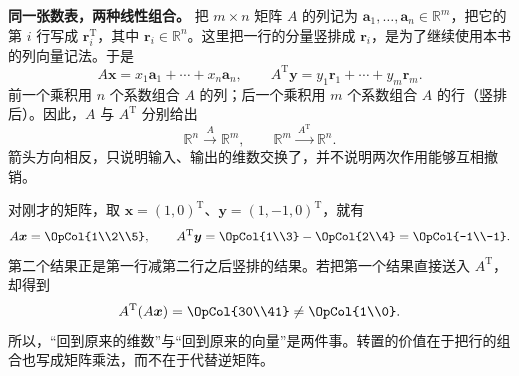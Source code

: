 \documentclass[a4paper,12pt,twoside,openany,fontset=none]{ctexbook}
\numberwithin{equation}{chapter}
\begin{document}

\par\medskip\noindent\textbf{同一张数表，两种线性组合。}
把 $m\times n$ 矩阵 $A$ 的列记为 $\boldsymbol a_1,\ldots,\boldsymbol a_n\in\mathbb R^m$，把它的第 $i$ 行写成 $\boldsymbol r_i^{\mathrm T}$，其中 $\boldsymbol r_i\in\mathbb R^n$。这里把一行的分量竖排成 $\boldsymbol r_i$，是为了继续使用本书的列向量记法。于是
\[
 A\boldsymbol x=x_1\boldsymbol a_1+\cdots+x_n\boldsymbol a_n,
 \qquad
 A^{\mathrm T}\boldsymbol y=y_1\boldsymbol r_1+\cdots+y_m\boldsymbol r_m.
\]
前一个乘积用 $n$ 个系数组合 $A$ 的列；后一个乘积用 $m$ 个系数组合 $A$ 的行（竖排后）。因此，$A$ 与 $A^{\mathrm T}$ 分别给出
\[
 \mathbb R^n\xrightarrow{\ A\ }\mathbb R^m,
 \qquad
 \mathbb R^m\xrightarrow{\ A^{\mathrm T}\ }\mathbb R^n.
\]
箭头方向相反，只说明输入、输出的维数交换了，并不说明两次作用能够互相撤销。

对刚才的矩阵，取 $\boldsymbol x=(1,0)^{\mathrm T}$、$\boldsymbol y=(1,-1,0)^{\mathrm T}$，就有
\[
 A\boldsymbol x=\OpCol{1\\2\\5},\qquad
 A^{\mathrm T}\boldsymbol y
 =\OpCol{1\\3}-\OpCol{2\\4}=\OpCol{-1\\-1}.
\]
第二个结果正是第一行减第二行之后竖排的结果。若把第一个结果直接送入 $A^{\mathrm T}$，却得到
\[
 A^{\mathrm T}(A\boldsymbol x)=\OpCol{30\\41}\ne\OpCol{1\\0}.
\]
所以，“回到原来的维数”与“回到原来的向量”是两件事。转置的价值在于把行的组合也写成矩阵乘法，而不在于代替逆矩阵。
\end{document}
